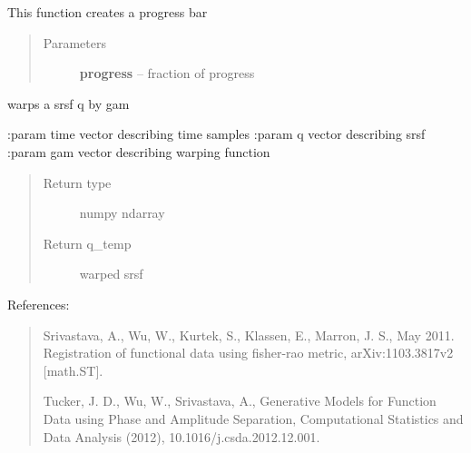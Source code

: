 \documentclass[letterpaper,10pt,english]{sphinxmanual}
\begin{document}

\begin{fulllineitems}
\label{utility_functions:utility_functions.update_progress}
This function creates a progress bar
\begin{quote}\begin{description}
\item[{Parameters}] \leavevmode
\textbf{progress} -- fraction of progress

\end{description}\end{quote}

\end{fulllineitems}


\begin{fulllineitems}
\label{utility_functions:utility_functions.warp_q_gamma}
warps a srsf q by gam

:param time vector describing time samples
:param q vector describing srsf
:param gam vector describing warping function
\begin{quote}\begin{description}
\item[{Return type}] \leavevmode
numpy ndarray

\item[{Return q\_temp}] \leavevmode
warped srsf

\end{description}\end{quote}

\end{fulllineitems}


References:
\begin{quote}

Srivastava, A., Wu, W., Kurtek, S., Klassen, E., Marron, J. S., May 2011. Registration of functional data using
fisher-rao metric, arXiv:1103.3817v2 {[}math.ST{]}.

Tucker, J. D., Wu, W., Srivastava, A., Generative Models for Function Data using Phase and Amplitude Separation,
Computational Statistics and Data Analysis (2012), 10.1016/j.csda.2012.12.001.
\end{quote}
\end{document}
